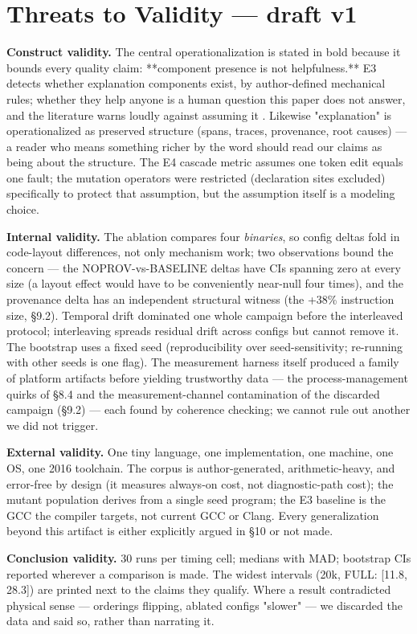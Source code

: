 \section{Threats to Validity --- draft v1}
\label{sec:threats}

\textbf{Construct validity.} The central operationalization is stated in
bold because it bounds every quality claim: **component presence is
not helpfulness.** E3 detects whether explanation components exist,
by author-defined mechanical rules; whether they help anyone is a
human question this paper does not answer, and the literature warns
loudly against assuming it \cite{denny2014enhancing,pettit2017enhanced}. Likewise "explanation" is
operationalized as preserved structure (spans, traces, provenance,
root causes) --- a reader who means something richer by the word
should read our claims as being about the structure. The E4 cascade
metric assumes one token edit equals one fault; the mutation
operators were restricted (declaration sites excluded) specifically
to protect that assumption, but the assumption itself is a modeling
choice.

\textbf{Internal validity.} The ablation compares four \emph{binaries}, so
config deltas fold in code-layout differences, not only mechanism
work; two observations bound the concern --- the NOPROV-vs-BASELINE
deltas have CIs spanning zero at every size (a layout effect would
have to be conveniently near-null four times), and the provenance
delta has an independent structural witness (the +38\% instruction
size, \S9.2). Temporal drift dominated one whole campaign before the
interleaved protocol; interleaving spreads residual drift across
configs but cannot remove it. The bootstrap uses a fixed seed
(reproducibility over seed-sensitivity; re-running with other seeds
is one flag). The measurement harness itself produced a family of
platform artifacts before yielding trustworthy data --- the
process-management quirks of \S8.4 and the measurement-channel
contamination of the discarded campaign (\S9.2) --- each found by
coherence checking; we cannot rule out another we did not trigger.

\textbf{External validity.} One tiny language, one implementation, one
machine, one OS, one 2016 toolchain. The corpus is author-generated,
arithmetic-heavy, and error-free by design (it measures always-on
cost, not diagnostic-path cost); the mutant population derives from
a single seed program; the E3 baseline is the GCC the compiler
targets, not current GCC or Clang. Every generalization beyond this
artifact is either explicitly argued in \S10 or not made.

\textbf{Conclusion validity.} 30 runs per timing cell; medians with MAD;
bootstrap CIs reported wherever a comparison is made. The widest
intervals (20k, FULL: [11.8, 28.3]) are printed next to the claims
they qualify. Where a result contradicted physical sense ---
orderings flipping, ablated configs "slower" --- we discarded the
data and said so, rather than narrating it.



